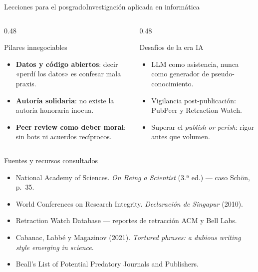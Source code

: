 \documentclass[11pt,aspectratio=169,xcolor=table]{beamer}
\begin{document}
\begin{frame}{Lecciones para el posgrado}{Investigación aplicada en informática}
  \begin{columns}[T,onlytextwidth]
    \begin{column}{0.48\textwidth}
      \begin{block}{Pilares innegociables}
        \begin{itemize}
          \item \textbf{Datos y código abiertos}: decir «perdí los datos» es
            confesar mala praxis.
          \item \textbf{Autoría solidaria}: no existe la autoría honoraria inocua.
          \item \textbf{Peer review como deber moral}: sin bots ni acuerdos recíprocos.
        \end{itemize}
      \end{block}
    \end{column}
    \begin{column}{0.48\textwidth}
      \begin{exampleblock}{Desafíos de la era IA}
        \begin{itemize}
          \item LLM como asistencia, nunca como generador de pseudo-conocimiento.
          \item Vigilancia post-publicación: PubPeer y Retraction Watch.
          \item Superar el \emph{publish or perish}: rigor antes que volumen.
        \end{itemize}
      \end{exampleblock}
    \end{column}
  \end{columns}
\end{frame}

\begin{frame}{Fuentes y recursos consultados}
  \begin{itemize}\usachaire
    \item National Academy of Sciences. \emph{On Being a Scientist} (3.ª ed.) — caso Schön, p.~35.
    \item World Conferences on Research Integrity. \emph{Declaración de Singapur} (2010).
    \item Retraction Watch Database — reportes de retracción ACM y Bell Labs.
    \item Cabanac, Labbé y Magazinov (2021). \emph{Tortured phrases: a dubious writing style emerging in science}.
    \item Beall's List of Potential Predatory Journals and Publishers.
  \end{itemize}
\end{frame}

\end{document}
